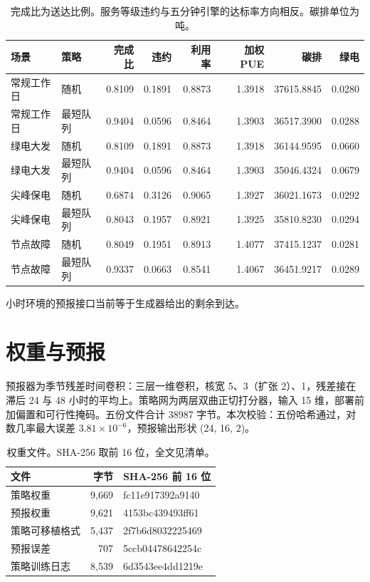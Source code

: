 \begin{table}[ht]
\centering
\caption{完成比为送达比例。服务等级违约与五分钟引擎的达标率方向相反。碳排单位为吨。}
\footnotesize
\setlength{\tabcolsep}{3pt}
\begin{tabular}{llrrrrrr}
\toprule
场景 & 策略 & 完成比 & 违约 & 利用率 & 加权 PUE & 碳排 & 绿电 \\
\midrule
常规工作日 & 随机 & 0.8109 & 0.1891 & 0.8873 & 1.3918 & 37615.8845 & 0.0280 \\
常规工作日 & 最短队列 & 0.9404 & 0.0596 & 0.8464 & 1.3903 & 36517.3900 & 0.0288 \\
绿电大发 & 随机 & 0.8109 & 0.1891 & 0.8873 & 1.3918 & 36144.9595 & 0.0660 \\
绿电大发 & 最短队列 & 0.9404 & 0.0596 & 0.8464 & 1.3903 & 35046.4324 & 0.0679 \\
尖峰保电 & 随机 & 0.6874 & 0.3126 & 0.9065 & 1.3927 & 36021.1673 & 0.0292 \\
尖峰保电 & 最短队列 & 0.8043 & 0.1957 & 0.8921 & 1.3925 & 35810.8230 & 0.0294 \\
节点故障 & 随机 & 0.8049 & 0.1951 & 0.8913 & 1.4077 & 37415.1237 & 0.0281 \\
节点故障 & 最短队列 & 0.9337 & 0.0663 & 0.8541 & 1.4067 & 36451.9217 & 0.0289 \\
\bottomrule
\end{tabular}
\end{table}

小时环境的预报接口当前等于生成器给出的剩余到达。

\section{权重与预报}
预报器为季节残差时间卷积：三层一维卷积，核宽 5、3（扩张 2）、1，残差接在滞后 24 与 48 小时的平均上。策略网为两层双曲正切打分器，输入 15 维，部署前加偏置和可行性掩码。五份文件合计 38987 字节。本次校验：五份哈希通过，对数几率最大误差 $3.81\times 10^{-6}$，预报输出形状 (24, 16, 2)。

\begin{table}[ht]
\centering
\caption{权重文件。SHA-256 取前 16 位，全文见清单。}
\small
\begin{tabular}{lrl}
\toprule
文件 & 字节 & SHA-256 前 16 位 \\
\midrule
策略权重 & 9{,}669 & fc11e917392a9140 \\
预报权重 & 9{,}621 & 4153bc439493ff61 \\
策略可移植格式 & 5{,}437 & 2f7b6d8032225469 \\
预报误差 & 707 & 5ccb04478642254c \\
策略训练日志 & 8{,}539 & 6d3543ee4dd1219e \\
\bottomrule
\end{tabular}
\end{table}

